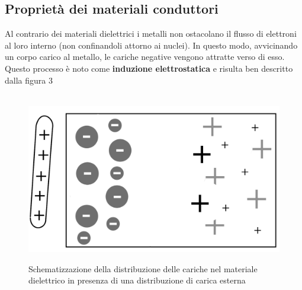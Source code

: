 \documentclass[11pt]{article}
\begin{document}
               \subsection{Proprietà dei materiali conduttori}
               Al contrario dei materiali dielettrici i metalli non ostacolano il flusso di elettroni al loro interno (non confinandoli attorno ai nuclei). In questo modo, avvicinando un corpo carico al metallo, le cariche negative vengono attratte verso di esso.\\Questo processo è noto come \textbf{induzione elettrostatica} e risulta ben descritto dalla figura 3
\begin{center}
\begin{figure}[H]
			  \vspace{-10pt}
              \hspace{-90pt}
              ~~~~~~~~~~~~~~~~~~~~~~~~~~~~~~~~~~~~~~~~~~~~ \includegraphics[scale=0.17]{dielettrico3}
               \caption{\small{Schematizzazione della distribuzione delle cariche nel materiale dielettrico in presenza di una distribuzione di carica esterna}}
               \end{figure} 
               \end{center}
\end{document}
